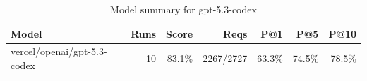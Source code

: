 \begin{table}[htbp]
\centering
\begin{tabular}{lrrrrrr}
\toprule
Model & Runs & Score & Reqs & P@1 & P@5 & P@10 \\
\midrule
vercel/openai/gpt-5.3-codex & 10 & 83.1\% & 2267/2727 & 63.3\% & 74.5\% & 78.5\% \\
\bottomrule
\end{tabular}
\caption{Model summary for gpt-5.3-codex}
\end{table}
